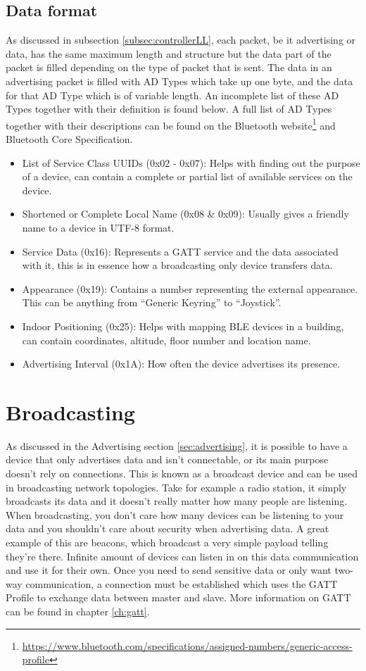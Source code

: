 \documentclass[pdftex,a4paper,12pt,twoside]{report}
\begin{document}
\subsection{Data format}
\label{subsec:advdataformat}
As discussed in subsection \ref{subsec:controllerLL}, each packet, be it advertising or data, has the same maximum length and structure but the data part of the packet is filled depending on the type of packet that is sent. The data in an advertising packet is filled with AD Types which take up one byte, and the data for that AD Type which is of variable length. An incomplete list of these AD Types together with their definition is found below. A full list of AD Types together with their descriptions can be found on the Bluetooth website\footnote{\url{https://www.bluetooth.com/specifications/assigned-numbers/generic-access-profile}} and Bluetooth Core Specification.

\begin{itemize}
	\item {List of Service Class UUIDs (0x02 - 0x07): Helps with finding out the purpose of a device, can contain a complete or partial list of available services on the device.}
	\item {Shortened or Complete Local Name (0x08 \& 0x09): Usually gives a friendly name to a device in UTF-8 format.}
	\item {Service Data (0x16): Represents a GATT service and the data associated with it, this is in essence how a broadcasting only device transfers data.}
	\item {Appearance (0x19): Contains a number representing the external appearance. This can be anything from ``Generic Keyring'' to ``Joystick''.}
	\item {Indoor Positioning (0x25): Helps with mapping BLE devices in a building, can contain coordinates, altitude, floor number and location name.}
	\item {Advertising Interval (0x1A): How often the device advertises its presence.}
\end{itemize}

\section{Broadcasting}
\label{sec:broadcasting}
As discussed in the Advertising section \ref{sec:advertising}, it is possible to have a device that only advertises data and isn't connectable, or its main purpose doesn't rely on connections. This is known as a broadcast device and can be used in broadcasting network topologies. Take for example a radio station, it simply broadcasts its data and it doesn't really matter how many people are listening. When broadcasting, you don't care how many devices can be listening to your data and you shouldn't care about security when advertising data. A great example of this are beacons, which broadcast a very simple payload telling they're there. Infinite amount of devices can listen in on this data communication and use it for their own. Once you need to send sensitive data or only want two-way communication, a connection must be established which uses the GATT Profile to exchange data between master and slave. More information on GATT can be found in chapter \ref{ch:gatt}.
\end{document}
